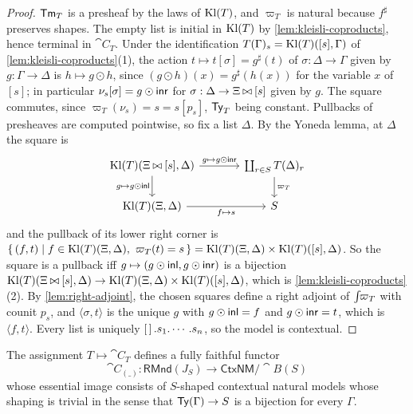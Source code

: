 \begin{proof}
    $\mathsf{Tm}_T$ is a presheaf by the laws of $\mathrm{Kl}(T)$, and $\varpi_T$ is natural because $f^\sharp$ preserves shapes. The empty list is initial in $\mathrm{Kl}(T)$ by \cref{lem:kleisli-coproducts}, hence terminal in $\cat{C}_T$. Under the identification $T(\Gamma)_s = \mathrm{Kl}(T)([s], \Gamma)$ of \cref{lem:kleisli-coproducts}(1), the action $t \mapsto t[\sigma] = g^\sharp(t)$ of $\sigma : \Delta \to \Gamma$ given by $g : \Gamma \to \Delta$ is $h \mapsto g \odot h$, since $(g \odot h)(x) = g^\sharp(h(x))$ for the variable $x$ of $[s]$; in particular $\nu_s[\sigma] = g \odot \mathsf{inr}$ for $\sigma : \Delta \to \Xi \mathbin{\bowtie} [s]$ given by $g$. The square commutes, since $\varpi_T(\nu_s) = s = s[p_s]$, $\mathsf{Ty}_T$ being constant. Pullbacks of presheaves are computed pointwise, so fix a list $\Delta$. By the Yoneda lemma, at $\Delta$ the square is
    \[\begin{tikzcd}[column sep=large]
        {\Kl(T)(\Xi \concat [s], \Delta)} & {\coprod_{r \in S} T(\Delta)_r} \\
        {\Kl(T)(\Xi, \Delta)} & S
        \arrow["{g \mapsto g \odot \inr}", from=1-1, to=1-2]
        \arrow["{g \mapsto g \odot \inl}"', from=1-1, to=2-1]
        \arrow["{\varpi_T}", from=1-2, to=2-2]
        \arrow["{f \mapsto s}"', from=2-1, to=2-2]
    \end{tikzcd}\]
    and the pullback of its lower right corner is $\{\, (f, t) \mid f \in \Kl(T)(\Xi, \Delta),\ \varpi_T(t) = s \,\} = \Kl(T)(\Xi, \Delta) \times \Kl(T)([s], \Delta)$. So the square is a pullback iff $g \mapsto (g \odot \mathsf{inl}, g \odot \mathsf{inr})$ is a bijection $\mathrm{Kl}(T)(\Xi \mathbin{\bowtie} [s], \Delta) \to \mathrm{Kl}(T)(\Xi, \Delta) \times \mathrm{Kl}(T)([s], \Delta)$, which is \cref{lem:kleisli-coproducts}(2). By \cref{lem:right-adjoint}, the chosen squares define a right adjoint of $\int\!\!\varpi_T$ with counit $p_s$, and $\langle \sigma, t \rangle$ is the unique $g$ with $g \odot \mathsf{inl} = f$ and $g \odot \mathsf{inr} = t$, which is $\langle f, t \rangle$. Every list is uniquely $\left[\,\right].s_1.\cdots.s_n$, so the model is contextual.
\end{proof}

\begin{proposition}\label{prop:rmnd-shaped}
    The assignment $T \mapsto \cat{C}_T$ defines a fully faithful functor $$\cat{C}_{(\_)} : \mathsf{RMnd}(J_S) \to \mathsf{CtxNM}/\cat{B}(S)$$ whose essential image consists of $S$-shaped contextual natural models whose shaping is trivial in the sense that $\mathsf{Ty}(\Gamma) \to S$ is a bijection for every $\Gamma$. 
\end{proposition}

